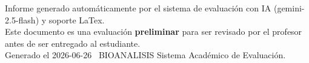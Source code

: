 \documentclass[11pt,a4paper]{article}
\begin{document}
\vspace{12pt}
\begin{center}
  \footnotesize\color{gray}
  Informe generado automáticamente por el sistema de evaluación con IA (gemini-2.5-flash) y soporte LaTex. \\
  Este documento es una evaluación \textbf{preliminar} para ser revisado por el profesor antes de ser entregado al 
  estudiante. \\
  Generado el 2026-06-26 \textbullet\ BIOANALISIS Sistema Académico de Evaluación.
  \end{center}
\end{document}
